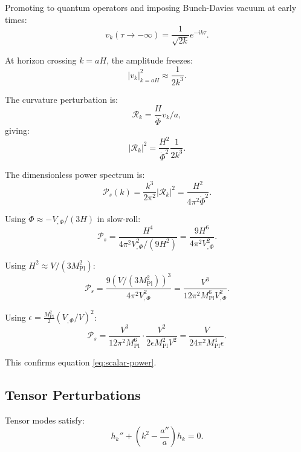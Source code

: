 \documentclass[11pt,a4paper]{article}
\numberwithin{equation}{section}
\theoremstyle{plain}
\theoremstyle{definition}
\theoremstyle{remark}
\begin{document}
Promoting to quantum operators and imposing Bunch-Davies vacuum at early times:
\begin{equation}
v_k(\tau\to -\infty) = \frac{1}{\sqrt{2k}}e^{-ik\tau}.
\end{equation}

At horizon crossing $k = aH$, the amplitude freezes:
\begin{equation}
|v_k|^2_{k=aH} \approx \frac{1}{2k^3}.
\end{equation}

The curvature perturbation is:
\begin{equation}
\mathcal{R}_k = \frac{H}{\dot{\Phi}}v_k/a,
\end{equation}
giving:
\begin{equation}
|\mathcal{R}_k|^2 = \frac{H^2}{\dot{\Phi}^2}\frac{1}{2k^3}.
\end{equation}

The dimensionless power spectrum is:
\begin{equation}
\mathcal{P}_s(k) = \frac{k^3}{2\pi^2}|\mathcal{R}_k|^2 = \frac{H^2}{4\pi^2\dot{\Phi}^2}.
\end{equation}

Using $\dot{\Phi} \approx -V_{,\Phi}/(3H)$ in slow-roll:
\begin{equation}
\mathcal{P}_s = \frac{H^4}{4\pi^2 V_{,\Phi}^2/(9H^2)} = \frac{9H^6}{4\pi^2 V_{,\Phi}^2}.
\end{equation}

Using $H^2 \approx V/(3M_{\mathrm{Pl}}^2)$:
\begin{equation}
\mathcal{P}_s = \frac{9(V/(3M_{\mathrm{Pl}}^2))^3}{4\pi^2 V_{,\Phi}^2} = \frac{V^3}{12\pi^2 M_{\mathrm{Pl}}^6 V_{,\Phi}^2}.
\end{equation}

Using $\epsilon = \frac{M_{\mathrm{Pl}}^2}{2}(V_{,\Phi}/V)^2$:
\begin{equation}
\mathcal{P}_s = \frac{V^3}{12\pi^2 M_{\mathrm{Pl}}^6}\cdot\frac{V^2}{2\epsilon M_{\mathrm{Pl}}^2 V^2} = \frac{V}{24\pi^2 M_{\mathrm{Pl}}^4\epsilon}.
\end{equation}

This confirms equation \eqref{eq:scalar-power}.

\subsection{Tensor Perturbations}

Tensor modes satisfy:
\begin{equation}
h_k'' + \left(k^2 - \frac{a''}{a}\right)h_k = 0.
\end{equation}
\end{document}
